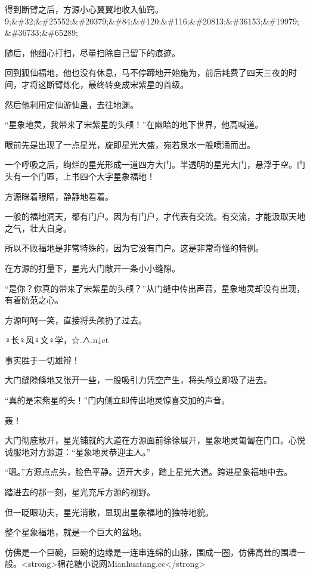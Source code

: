 
\begin{this_body}

得到断臂之后，方源小心翼翼地收入仙窍。9;\&\#32;\&\#25552;\&\#20379;\&\#84;\&\#120;\&\#116;\&\#20813;\&\#36153;\&\#19979;\&\#36733;\&\#65289;

随后，他细心打扫，尽量扫除自己留下的痕迹。

回到狐仙福地，他也没有休息，马不停蹄地开始施为，前后耗费了四天三夜的时间，才将这断臂炼化，最终转变成宋紫星的首级。

然后他利用定仙游仙蛊，去往地渊。

“星象地灵，我带来了宋紫星的头颅！”在幽暗的地下世界，他高喊道。

眼前先是出现了一点星光，旋即星光大盛，宛若泉水一般喷涌而出。

一个呼吸之后，绚烂的星光形成一道四方大门。半透明的星光大门，悬浮于空。门头有一个门匾，上书四个大字星象福地！

方源眯着眼睛，静静地看着。

一般的福地洞天，都有门户。因为有门户，才代表有交流。有交流，才能汲取天地之气，壮大自身。

所以不败福地是非常特殊的，因为它没有门户。这是非常奇怪的特例。

在方源的打量下，星光大门敞开一条小小缝隙。

“是你？你真的带来了宋紫星的头颅？”从门缝中传出声音，星象地灵却没有出现，有着防范之心。

方源呵呵一笑，直接将头颅扔了过去。

♀长♀风♀文♀学，☆.∧.n↓et

事实胜于一切雄辩！

大门缝隙倏地又张开一些，一股吸引力凭空产生，将头颅立即吸了进去。

“真的是宋紫星的头！”门内侧立即传出地灵惊喜交加的声音。

轰！

大门彻底敞开，星光铺就的大道在方源面前徐徐展开，星象地灵匍匐在门口。心悦诚服地对方源道：“星象地灵恭迎主人。”

“嗯。”方源点点头，脸色平静。迈开大步，踏上星光大道。跨进星象福地中去。

踏进去的那一刻，星光充斥方源的视野。

但一眨眼功夫，星光消散，显现出星象福地的独特地貌。

整个星象福地，就是一个巨大的盆地。

仿佛是一个巨碗，巨碗的边缘是一连串连绵的山脉，围成一圈，仿佛高耸的围墙一般。<strong>棉花糖小说网Mianhuatang.cc</strong>


\end{this_body}
